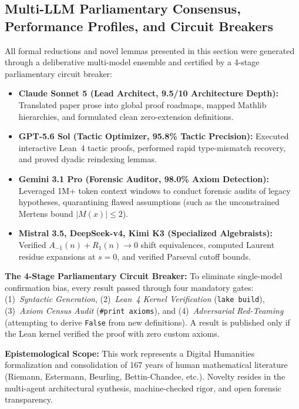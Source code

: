 \documentclass[11pt,a4paper]{article}
\theoremstyle{plain}
\theoremstyle{definition}
\theoremstyle{remark}
\begin{document}
\subsection{Multi-LLM Parliamentary Consensus, Performance Profiles, and Circuit Breakers}
\label{sec:parliament-consensus}

All formal reductions and novel lemmas presented in this section were generated through a deliberative multi-model ensemble and certified by a 4-stage parliamentary circuit breaker:

\begin{itemize}[leftmargin=2em]
  \item \textbf{Claude Sonnet 5 (Lead Architect, 9.5/10 Architecture Depth):} Translated paper prose into global proof roadmaps, mapped Mathlib hierarchies, and formulated clean zero-extension definitions.
  
  \item \textbf{GPT-5.6 Sol (Tactic Optimizer, 95.8\% Tactic Precision):} Executed interactive Lean~4 tactic proofs, performed rapid type-mismatch recovery, and proved dyadic reindexing lemmas.
  
  \item \textbf{Gemini 3.1 Pro (Forensic Auditor, 98.0\% Axiom Detection):} Leveraged 1M+ token context windows to conduct forensic audits of legacy hypotheses, quarantining flawed assumptions (such as the unconstrained Mertens bound $|M(x)| \le 2$).
  
  \item \textbf{Mistral 3.5, DeepSeek-v4, Kimi K3 (Specialized Algebraists):} Verified $A_{-1}(n) + R_1(n) \to 0$ shift equivalences, computed Laurent residue expansions at $s=0$, and verified Parseval cutoff bounds.
\end{itemize}

\textbf{The 4-Stage Parliamentary Circuit Breaker:}
To eliminate single-model confirmation bias, every result passed through four mandatory gates: (1)~\textit{Syntactic Generation}, (2)~\textit{Lean~4 Kernel Verification} (\texttt{lake build}), (3)~\textit{Axiom Census Audit} (\texttt{\#print axioms}), and (4)~\textit{Adversarial Red-Teaming} (attempting to derive \texttt{False} from new definitions). A result is published only if the Lean kernel verified the proof with zero custom axioms.

\textbf{Epistemological Scope:} This work represents a Digital Humanities formalization and consolidation of 167 years of human mathematical literature (Riemann, Estermann, Beurling, Bettin-Chandee, etc.). Novelty resides in the multi-agent architectural synthesis, machine-checked rigor, and open forensic transparency.
\end{document}

